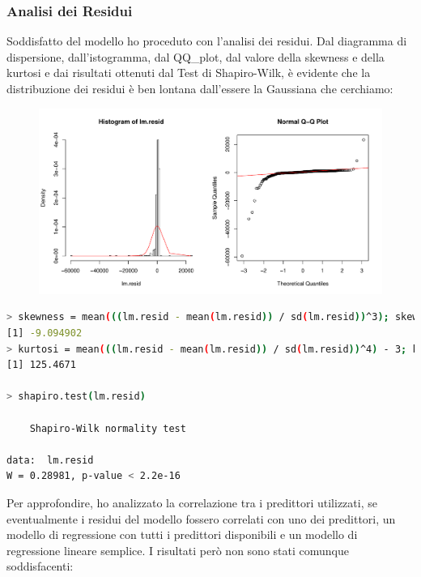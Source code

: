 \documentclass[11pt,a4paper]{article}
\begin{document}
\subsubsection{Analisi dei Residui}
Soddisfatto del modello ho proceduto con l'analisi dei residui. Dal diagramma di
dispersione, dall'istogramma, dal QQ\_plot, dal valore della skewness e della
kurtosi e dai risultati ottenuti dal Test di Shapiro-Wilk, \`e evidente che la
distribuzione dei residui \`e ben lontana dall'essere la Gaussiana che
cerchiamo:
\clearpage
\begin{figure}[H]
	\vspace{-1cm}
	\hspace{-1.5cm}
	\includegraphics[scale=0.7]{imgs/residuals.pdf}
\end{figure}
\vspace{-0.8cm}
\begin{lstlisting}[language=bash,basicstyle=\tiny,tabsize=2,frame = single]
> skewness = mean(((lm.resid - mean(lm.resid)) / sd(lm.resid))^3); skewness
[1] -9.094902
> kurtosi = mean(((lm.resid - mean(lm.resid)) / sd(lm.resid))^4) - 3; kurtosi
[1] 125.4671

> shapiro.test(lm.resid)

	Shapiro-Wilk normality test

data:  lm.resid
W = 0.28981, p-value < 2.2e-16
\end{lstlisting}
\vspace{0.2cm}
Per approfondire, ho analizzato la correlazione tra i predittori utilizzati, se
eventualmente i residui del modello fossero correlati con uno dei predittori, un
modello di regressione con tutti i predittori disponibili e un modello di
regressione lineare semplice. I risultati per\`o non sono stati comunque
soddisfacenti:
\vspace{0.2cm}
\end{document}
